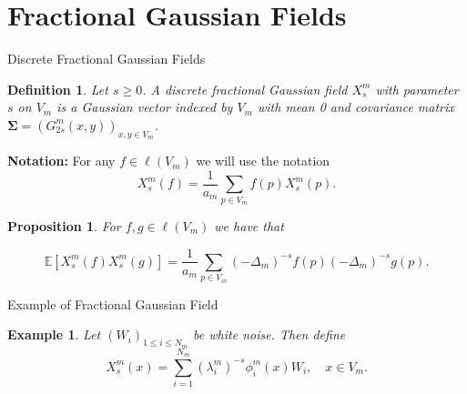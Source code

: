 \documentclass{beamer}
\newcounter{chapCount}
\newtheorem{defi}[theorems]{Definition}
\newtheorem{prop}[theorems]{Proposition}
\newtheorem{exam}[theorems]{Example}
\newcommand{\e}{\mathbb{E}}
\begin{document}
	\section{Fractional Gaussian Fields}
	\begin{frame}{Discrete Fractional Gaussian Fields}
		\setcounter{chapCount}{3}
		\setcounter{theorems}{0}
		\vspace{4em}
		\begin{defi}\label{fractionalGaussianFieldDiscrete}
			Let $s \geq 0$. A \emph{discrete fractional Gaussian field} $X_s^{m}$ with parameter $s$ on $V_m$ is a Gaussian vector indexed by $V_m$ with mean 0 and covariance matrix $\mathbf{\Sigma} = \left(G_{2s}^{m}(x,y)\right)_{x,y \in V_m}$.
		\end{defi}
		\pause
		
		\vspace{-0.5em}
		\textbf{Notation: } For any $f \in \ell(V_m)$ we will use the notation
		\vspace{-0.5em}
		\begin{equation}
			X_s^{m}(f) = \frac{1}{a_m}\sum_{p \in V_m}f(p)X^{m}_{s}(p).
		\end{equation}
	\pause
	
	\vspace{-1em}
	\begin{prop}\label{theOneWeNeedInTheEndSomehow}
		For $f,g \in \ell(V_m)$ we have that
		
		\vspace{-1.5em}
		\begin{equation}
			\e \left[X_s^{m}(f)X_s^{m}(g)\right] = \frac{1}{a_m} \sum_{p \in V_m} (-\Delta_{m})^{-s}f(p)(-\Delta_{m})^{-s}g(p).
		\end{equation}
	\end{prop}
	\end{frame}
	
	\begin{frame}{Example of Fractional Gaussian Field}
		
		\vspace{3em}
		\begin{exam}\label{OneToSimulate}
			Let $(W_i)_{1\leq i \leq N_m}$ be white noise. Then define
			\begin{equation}
				X_{s}^{m}(x) = \sum_{i=1}^{N_m}\left(\lambda_i^{m}\right)^{-s}\phi^{m}_{i}(x)W_i, \quad x \in V_m.
			\end{equation}
		\end{exam}
		\end{frame}
	
\end{document}
